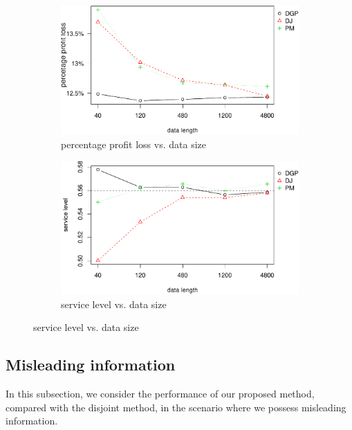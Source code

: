 \documentclass{article}
\begin{document}
\begin{figure}[ht]
\centering
\caption{Performance vs. data size with nonlinear profit function}
\begin{subfigure}[b]{0.48\textwidth}
\centering
\includegraphics[width=\textwidth]{nonlinear-plot_files/figure-latex/ppl-1.pdf}
\caption{percentage profit loss vs. data size}
\end{subfigure}
\hfill
\begin{subfigure}[b]{0.48\textwidth}
\centering
\includegraphics[width=\textwidth]{nonlinear-plot_files/figure-latex/sl-1.pdf}
\caption{service level vs. data size}
\end{subfigure}
\label{fig:non}
\end{figure}


\subsection{Misleading information} \label{sub:exp3}

In this subsection, we consider the performance of our proposed method, compared with the disjoint method, in the scenario where we possess misleading information. 
\end{document}
